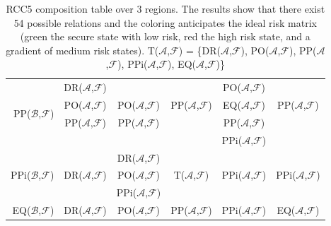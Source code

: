 \documentclass[conference]{IEEEtran}
\newcommand{\assertionRegion}{\mathcal{A}}
\newcommand{\beliefRegion}{\mathcal{B}}
\newcommand{\factRegion}{\mathcal{F}}
\newcommand{\eq}[2]{EQ(#1,#2)}
\newcommand{\pp}[2]{PP(#1,#2)}
\newcommand{\po}[2]{PO(#1,#2)}
\newcommand{\ppi}[2]{PPi(#1,#2)}
\newcommand{\dr}[2]{DR(#1,#2)}
\newcommand{\all}[2]{T(#1,#2)}
\begin{document}
\begin{table}[t]
\begin{adjustbox}{width=\columnwidth}
\begin{tabular}{r||c|c|c|c|c}
	\cellcolor{abf-rg-4}& %
	\cellcolor{abf-rg-5}\\ %
\hline %
 \multirow{4}{*}{\pp{$\beliefRegion$}{$\factRegion$}} &
	\cellcolor{abf-rg-2}\dr{$\assertionRegion$}{$\factRegion$} & 
	\cellcolor{abf-rg-3}&
	\cellcolor{abf-rg-4} & %
	\cellcolor{abf-rg-5}\po{$\assertionRegion$}{$\factRegion$} & %
	\cellcolor{abf-rg-6}\\ %
 & \cellcolor{abf-rg-2}\po{$\assertionRegion$}{$\factRegion$} & 
	\cellcolor{abf-rg-3}\po{$\assertionRegion$}{$\factRegion$} & 
	\cellcolor{abf-rg-4}\pp{$\assertionRegion$}{$\factRegion$} & %
	\cellcolor{abf-rg-5}\eq{$\assertionRegion$}{$\factRegion$} & %
	\cellcolor{abf-rg-6}\pp{$\assertionRegion$}{$\factRegion$} \\ %
 & \cellcolor{abf-rg-2}\pp{$\assertionRegion$}{$\factRegion$} & 
	\cellcolor{abf-rg-3}\pp{$\assertionRegion$}{$\factRegion$} & 
	\cellcolor{abf-rg-4} & %
	\cellcolor{abf-rg-5}\pp{$\assertionRegion$}{$\factRegion$} & %
	\cellcolor{abf-rg-6} \\ %
 & \cellcolor{abf-rg-2}&
 	\cellcolor{abf-rg-3} & 
	\cellcolor{abf-rg-4}& %
	\cellcolor{abf-rg-5}\ppi{$\assertionRegion$}{$\factRegion$} & %
	\cellcolor{abf-rg-6} \\ %
\hline %
 \multirow{3}{*}{\ppi{$\beliefRegion$}{$\factRegion$}} &
 	\cellcolor{abf-rg-3}\multirow{3}{*}{} &
 	\cellcolor{abf-rg-4}\dr{$\assertionRegion$}{$\factRegion$} &
 	\cellcolor{abf-rg-5}& %
 	\cellcolor{abf-rg-6}& %
 	\cellcolor{abf-rg-7} \\ %
& \cellcolor{abf-rg-3}\dr{$\assertionRegion$}{$\factRegion$} &
 	\cellcolor{abf-rg-4}\po{$\assertionRegion$}{$\factRegion$} & 
 	\cellcolor{abf-rg-5}\all{$\assertionRegion$}{$\factRegion$}& %
 	\cellcolor{abf-rg-6}\ppi{$\assertionRegion$}{$\factRegion$}& %
 	\cellcolor{abf-rg-7}\ppi{$\assertionRegion$}{$\factRegion$}\\ %
& \cellcolor{abf-rg-3} & 
	\cellcolor{abf-rg-4}\ppi{$\assertionRegion$}{$\factRegion$} & 
	\cellcolor{abf-rg-5} & %
	\cellcolor{abf-rg-6}& %
	\cellcolor{abf-rg-7}\\ %
\hline %
	\eq{$\beliefRegion$}{$\factRegion$} & 
	\cellcolor{abf-rg-4}\dr{$\assertionRegion$}{$\factRegion$} & 
	\cellcolor{abf-rg-5} \po{$\assertionRegion$}{$\factRegion$} & 
	\cellcolor{abf-rg-6}\pp{$\assertionRegion$}{$\factRegion$} & %
	\cellcolor{abf-rg-7} \ppi{$\assertionRegion$}{$\factRegion$} & %
	\cellcolor{abfgreen} \eq{$\assertionRegion$}{$\factRegion$}  %
\end{tabular}
\end{adjustbox}
\caption{RCC5 composition table over 3 regions. The results show that there
exist 54 possible relations and the coloring anticipates the ideal risk matrix
(green the secure state with low risk, red the high risk state, and a gradient
of medium risk states). 
\all{$\assertionRegion$}{$\factRegion$} = \{\dr{$\assertionRegion$}{$\factRegion$}, \po{$\assertionRegion$}{$\factRegion$}, \pp{$\assertionRegion$}{$\factRegion$}, \ppi{$\assertionRegion$}{$\factRegion$}, \eq{$\assertionRegion$}{$\factRegion$}\}
\label{tab:5com}}
\end{table}
\end{document}
